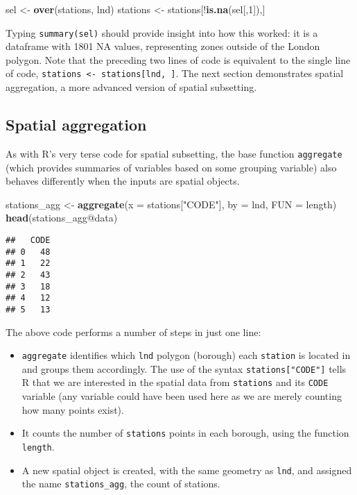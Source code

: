\documentclass[]{article}
\newenvironment{Shaded}{}{}
\newcommand{\KeywordTok}[1]{\textcolor[rgb]{0.00,0.44,0.13}{\textbf{{#1}}}}
\newcommand{\DataTypeTok}[1]{\textcolor[rgb]{0.56,0.13,0.00}{{#1}}}
\newcommand{\DecValTok}[1]{\textcolor[rgb]{0.25,0.63,0.44}{{#1}}}
\newcommand{\StringTok}[1]{\textcolor[rgb]{0.25,0.44,0.63}{{#1}}}
\newcommand{\NormalTok}[1]{{#1}}
\begin{document}
\begin{Shaded}
\begin{Highlighting}[]
\NormalTok{sel <-}\StringTok{ }\KeywordTok{over}\NormalTok{(stations, lnd)}
\NormalTok{stations <-}\StringTok{ }\NormalTok{stations[!}\KeywordTok{is.na}\NormalTok{(sel[,}\DecValTok{1}\NormalTok{]),]}
\end{Highlighting}
\end{Shaded}

Typing \texttt{summary(sel)} should provide insight into how this
worked: it is a dataframe with 1801 NA values, representing zones
outside of the London polygon. Note that the preceding two lines of code
is equivalent to the single line of code,
\texttt{stations \textless{}- stations{[}lnd, {]}}. The next section
demonstrates spatial aggregation, a more advanced version of spatial
subsetting.

\subsection{Spatial aggregation}\label{spatial-aggregation}

As with R's very terse code for spatial subsetting, the base function
\texttt{aggregate} (which provides summaries of variables based on some
grouping variable) also behaves differently when the inputs are spatial
objects.

\begin{Shaded}
\begin{Highlighting}[]
\NormalTok{stations_agg <-}\StringTok{ }\KeywordTok{aggregate}\NormalTok{(}\DataTypeTok{x =} \NormalTok{stations[}\StringTok{"CODE"}\NormalTok{], }\DataTypeTok{by =} \NormalTok{lnd, }\DataTypeTok{FUN =} \NormalTok{length)}
\KeywordTok{head}\NormalTok{(stations_agg@data)}
\end{Highlighting}
\end{Shaded}

\begin{verbatim}
##   CODE
## 0   48
## 1   22
## 2   43
## 3   18
## 4   12
## 5   13
\end{verbatim}

The above code performs a number of steps in just one line:

\begin{itemize}
\itemsep1pt\parskip0pt
\item
  \texttt{aggregate} identifies which \texttt{lnd} polygon (borough)
  each \texttt{station} is located in and groups them accordingly. The
  use of the syntax \texttt{stations{[}"CODE"{]}} tells R that we are
  interested in the spatial data from \texttt{stations} and its
  \texttt{CODE} variable (any variable could have been used here as we
  are merely counting how many points exist).
\item
  It counts the number of \texttt{stations} points in each borough,
  using the function \texttt{length}.
\item
  A new spatial object is created, with the same geometry as
  \texttt{lnd}, and assigned the name \texttt{stations\_agg}, the count
  of stations.
\end{itemize}
\end{document}
